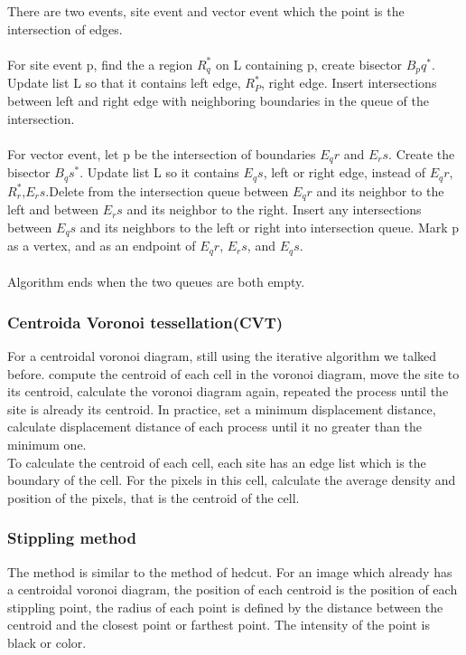 \documentclass[11pt]{article}
\begin{document}
\\\\There are two events, site event and vector event which the point is the intersection of edges.
\\\\For site event p, find the a region $R_q^*$ on L containing p, create bisector $B_pq^*$. Update list L
so that it contains left edge, $R_P^*$, right edge. Insert intersections between left and right edge with
neighboring boundaries in the queue of the intersection.
\\\\For vector event, let p be the intersection of boundaries $E_qr$ and $E_rs$. Create the bisector $B_qs^*$.
Update list L so it contains $E_qs$, left or right edge, instead of $E_qr$, $R_r^*$,$E_rs$.Delete from the intersection queue between $E_qr$ and its neighbor to the left and between $E_rs$ and its neighbor to the right. Insert any intersections between $E_qs$ and its neighbors to the left or right into intersection queue.
Mark p as a vertex, and as an endpoint of $E_qr$, $E_rs$, and $E_qs$.
\\\\ Algorithm ends when the two queues are both empty.


\subsubsection{Centroida Voronoi tessellation(CVT)}
For a centroidal voronoi diagram, still using the iterative algorithm\cite{secord2002weighted} we talked before.
compute the centroid of each cell in the voronoi diagram, move the site to its centroid, calculate the voronoi diagram again, repeated the process until the site is already its centroid. In practice, set a minimum displacement distance, calculate displacement distance of each process until it no greater than the minimum one. 
\\To calculate the centroid of each cell, each site has an edge list which is the boundary of the cell. For the pixels in this cell, calculate
the average density and position of the pixels, that is the centroid of the cell.

\subsubsection{Stippling method}
The method is similar to the method of hedcut. For an image which already has a centroidal voronoi diagram, the position of each centroid is the position of each stippling point, the radius of each point is defined by the distance between the centroid and the closest point or farthest point. The intensity of the point is black or color.
\end{document}
